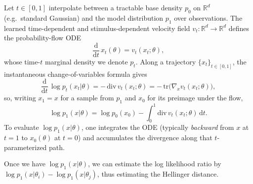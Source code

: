 Let $t\in[0,1]$ interpolate between a tractable base density $p_0$ on $\mathbb{R}^d$ (e.g.\ standard Gaussian) and the model distribution $p_1$ over observations.
The learned time-dependent and stimulus-dependent velocity field $v_t:\mathbb{R}^d\to\mathbb{R}^d$ defines the probability-flow ODE
\begin{equation}
  \frac{\mathrm{d}}{\mathrm{d}t}\, x_t(\theta) = v_t(x_t; \theta),
\end{equation}
whose time-$t$ marginal density we denote $p_t$.
Along a trajectory $\{x_t\}_{t\in[0,1]}$, the instantaneous change-of-variables formula gives
\begin{equation}
  \frac{\mathrm{d}}{\mathrm{d}t}\, \log p_t(x_t | \theta)
  = -\,\mathrm{div}\, v_t(x_t; \theta)
  = -\,\mathrm{tr}\!\bigl(\nabla_x v_t(x_t; \theta)\bigr),
\end{equation}
so, writing $x_1=x$ for a sample from $p_1$ and $x_0$ for its preimage under the flow,
\begin{equation}
  \log p_1(x | \theta)
  = \log p_0(x_0)
    - \int_0^1 \mathrm{div}\, v_t(x_t; \theta)\,\mathrm{d}t.
\end{equation}
To evaluate $\log p_1(x | \theta)$, one integrates the ODE (typically \emph{backward} from $x$ at $t=1$ to $x_0(\theta)$ at $t=0$) and accumulates the divergence along that $t$-parameterized path.

Once we have $\log p_1(x | \theta)$, we can estimate the log likelihood ratio by $\log p_1(x | \theta_i) - \log p_1(x | \theta_j)$, thus estimating the Hellinger distance.